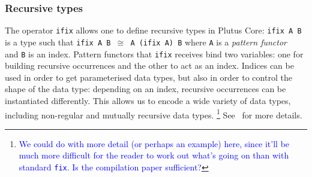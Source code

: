 \documentclass[a4paper]{article}
\newcommand{\blue}[1]{\textcolor{blue}{#1}}
\begin{document}



\subsubsection{Recursive types}
\label{sec:ifix-note}
\noindent
The operator \texttt{ifix} allows one to define recursive types in
Plutus Core: \texttt{ifix A B} is a type such that \texttt{ifix A B
  $\cong$ A (ifix A) B} where \texttt{A} is a \textit{pattern
  functor}~\citep[2.4]{backhouseetal98} and \texttt{B} is an
index. Pattern functors that \texttt{ifix} receives bind two
variables: one for building recursive occurrences and the other to act
as an index. Indices can be used in order to get parameterised data
types, but also in order to control the shape of the data type:
depending on an index, recursive occurrences can be instantiated
differently.  This allows us to encode a wide variety of data types,
including non-regular and mutually recursive data types.%
\blue{\footnote{\blue{We could do with more detail (or perhaps an
      example) here, since it'll be much more difficult for the reader
      to work out what's going on than with standard \texttt{fix}.  Is
      the compilation paper sufficient?}}}
See~\cite{compiling-to-fomega-2019} for more details.
\end{document}
